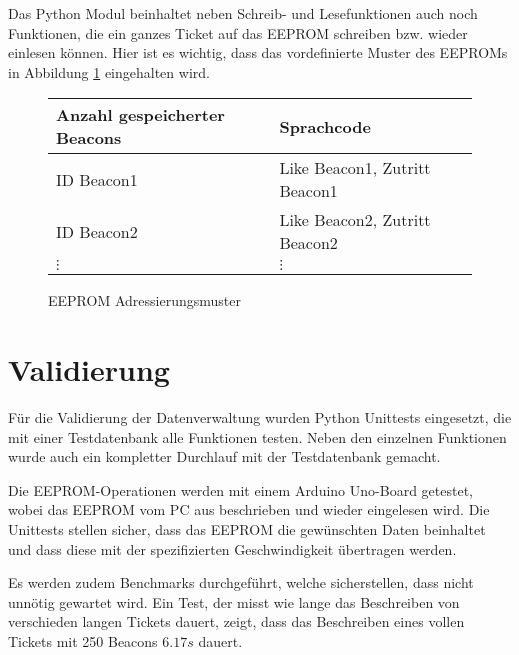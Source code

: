 Das Python Modul beinhaltet neben Schreib- und Lesefunktionen auch noch Funktionen, die ein ganzes Ticket auf das EEPROM schreiben bzw. wieder einlesen können.
Hier ist es wichtig, dass das vordefinierte Muster des EEPROMs in Abbildung \ref{eeprom_memory_pattern} eingehalten wird.


\begin{figure}[h]
	\begin{tabular}{l|l}
		Anzahl gespeicherter Beacons & Sprachcode                      \\ \hline
		ID Beacon1                   & Like Beacon1, Zutritt Beacon1   \\ \hline
		ID Beacon2                   & Like Beacon2, Zutritt Beacon2   \\ \hline
		\(\vdots\)                   & \(\vdots\) 
	\end{tabular}
	\caption{EEPROM Adressierungsmuster}
	\label{eeprom_memory_pattern}
\end{figure}

\section{Validierung}
Für die Validierung der Datenverwaltung wurden Python Unittests eingesetzt, die mit einer Testdatenbank alle Funktionen testen.
Neben den einzelnen Funktionen wurde auch ein kompletter Durchlauf mit der Testdatenbank gemacht.

Die EEPROM-Operationen werden mit einem Arduino Uno-Board getestet, wobei das EEPROM vom PC aus beschrieben und wieder eingelesen wird.
Die Unittests stellen sicher, dass das EEPROM die gewünschten Daten beinhaltet und dass diese mit der spezifizierten Geschwindigkeit übertragen werden.

Es werden zudem Benchmarks durchgeführt, welche sicherstellen, dass nicht unnötig gewartet wird.
Ein Test, der misst wie lange das Beschreiben von verschieden langen Tickets dauert, zeigt, dass das Beschreiben eines vollen Tickets mit 250 Beacons $6.17s$ dauert.

